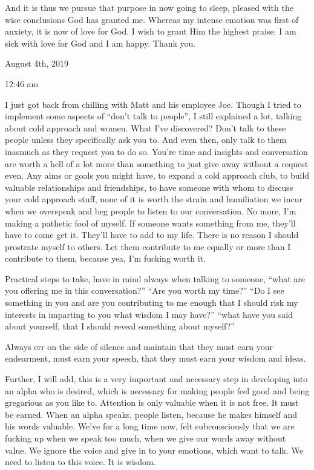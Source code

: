 \qquad And it is thus we pursue that purpose in now going to sleep,
pleased with the wise conclusions God has granted me. Whereas my intense
emotion was first of anxiety, it is now of love for God. I wish to grant
Him the highest praise. I am sick with love for God and I am happy.
Thank you.

\bigskip
\bigskip
August 4th, 2019

12:46 am

I just got back from chilling with Matt and his employee Joe. Though I
tried to implement some aspects of ``don't talk to people'', I still
explained a lot, talking about cold approach and women. What I've
discovered? Don't talk to these people unless they specifically ask you
to. And even then, only talk to them inasmuch as they request you to do
so. You're time and insights and conversation are worth a hell of a lot
more than something to just give away without a request even. Any aims
or goals you might have, to expand a cold approach club, to build
valuable relationships and friendships, to have someone with whom to
discuss your cold approach stuff, none of it is worth the strain and
humiliation we incur when we overspeak and beg people to listen to our
conversation. No more, I'm making a pathetic fool of myself. If someone
wants something from me, they'll have to come get it. They'll have to
add to my life. There is no reason I should prostrate myself to others.
Let them contribute to me equally or more than I contribute to them,
because yea, I'm fucking worth it.

Practical steps to take, have in mind always when talking to someone,
``what are you offering me in this conversation?'' ``Are you worth my
time?'' ``Do I see something in you and are you contributing to me
enough that I should risk my interests in imparting to you what wisdom I
may have?'' ``what have you said about yourself, that I should reveal
something about myself?''

Always err on the side of silence and maintain that they must earn your
endearment, must earn your speech, that they must earn your wisdom and
ideas.

Further, I will add, this is a very important and necessary step in
developing into an alpha who is desired, which is necessary for making
people feel good and being gregarious as you like to. Attention is only
valuable when it is not free. It must be earned. When an alpha speaks,
people listen, because he makes himself and his words valuable. We've
for a long time now, felt subconsciously that we are fucking up when we
speak too much, when we give our words away without value. We ignore the
voice and give in to your emotions, which want to talk. We need to
listen to this voice. It is wisdom.

